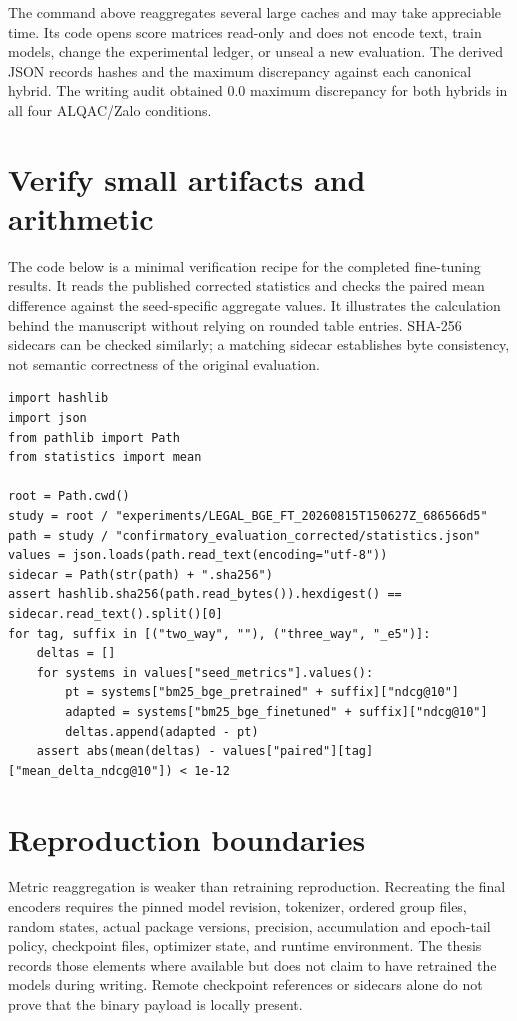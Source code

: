 The command above reaggregates several large caches and may take appreciable time. Its code opens score matrices read-only and does not encode text, train models, change the experimental ledger, or unseal a new evaluation. The derived JSON records hashes and the maximum discrepancy against each canonical hybrid. The writing audit obtained 0.0 maximum discrepancy for both hybrids in all four ALQAC/\allowbreak{}Zalo conditions.

\section{Verify small artifacts and arithmetic}

The code below is a minimal verification recipe for the completed fine-tuning results. It reads the published corrected statistics and checks the paired mean difference against the seed-specific aggregate values. It illustrates the calculation behind the manuscript without relying on rounded table entries. SHA-256 sidecars can be checked similarly; a matching sidecar establishes byte consistency, not semantic correctness of the original evaluation.

\begin{Verbatim}[fontsize=\footnotesize,breaklines=true,breakanywhere=true]
import hashlib
import json
from pathlib import Path
from statistics import mean

root = Path.cwd()
study = root / "experiments/LEGAL_BGE_FT_20260815T150627Z_686566d5"
path = study / "confirmatory_evaluation_corrected/statistics.json"
values = json.loads(path.read_text(encoding="utf-8"))
sidecar = Path(str(path) + ".sha256")
assert hashlib.sha256(path.read_bytes()).hexdigest() == sidecar.read_text().split()[0]
for tag, suffix in [("two_way", ""), ("three_way", "_e5")]:
    deltas = []
    for systems in values["seed_metrics"].values():
        pt = systems["bm25_bge_pretrained" + suffix]["ndcg@10"]
        adapted = systems["bm25_bge_finetuned" + suffix]["ndcg@10"]
        deltas.append(adapted - pt)
    assert abs(mean(deltas) - values["paired"][tag]["mean_delta_ndcg@10"]) < 1e-12
\end{Verbatim}
\section{Reproduction boundaries}

Metric reaggregation is weaker than retraining reproduction. Recreating the final encoders requires the pinned model revision, tokenizer, ordered group files, random states, actual package versions, precision, accumulation and epoch-tail policy, checkpoint files, optimizer state, and runtime environment. The thesis records those elements where available but does not claim to have retrained the models during writing. Remote checkpoint references or sidecars alone do not prove that the binary payload is locally present.


